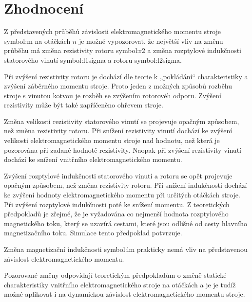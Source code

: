 \documentclass[a4paper, twoside, 11pt]{article}
\begin{document}
\newpage
{} 
\section*{Zhodnocení}
Z představených průběhů závislosti elektromagnetického momentu stroje \gls{symbol:m} na otáčkách $n$ je možné vypozorovat, že největší vliv na změnu průběhu má změna rezistivity rotoru \gls{symbol:r2} a změna rozptylové indukčnosti statorového vinutí \gls{symbol:l1sigma} a rotoru \gls{symbol:l2sigma}.\par
Při zvýšení rezistivity rotoru je dochází dle teorie k „pokládání“ charakteristiky a zvýšení záběrného momentu stroje. Proto jeden z možných způsobů rozběhu stroje s vinutou kotvou je rozběh se zvýšením rotorovéh odporu. Zvýšení rezistivity může být také zapříčeněno ohřevem stroje.\par
Změna velikosti rezistivity statorového vinutí se projevuje opačným způsobem, než změna rezistivity rotoru. Při snížení rezistivity vinutí dochází ke zvýšení velikosti elektromagnetického momentu stroje nad hodnotu, než která je pozorována při zadané hodnotě rezistivity. Naopak při zvýšení rezistivity vinutí dochází ke snížení vnitřního elektromagnetického momentu.\par
Zvýšení rozptylové indukčnosti statorového vinutí a rotoru se opět projevuje opačným způsobem, než změna rezistivity rotoru. Při snížení indukčnosti dochází ke zvýšení hodnoty elektromagnetického momentu při určitých otáčkách stroje. Při zvýšení rozptylové indukčnosti poté ke snížení momentu. Z teoretických předpokladů je zřejmé, že je vyžadována co nejmenší hodnota rozptylového magnetického toku, který se uzavírá cestami, které jsou odlišné od cesty hlavního magnetizačního toku. Simulace tento předpoklad potvrzuje.\par
Změna magnetizační indukčnosti \gls{symbol:lm} prakticky nemá vliv na představenou závislost elektromagnetického momentu.\par
Pozorované změny odpovídají teoretickým předpokladům o změně statické charakteristiky vnitřního elektromagnetického stroje na otáčkách a je je tudíž možné aplikovat i na dynamickou závislost elektromagnetického momentu stroje.

\flushbottom %

\end{document}
